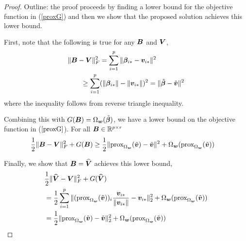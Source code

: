 \begin{proof}
Outline: the proof proceeds by finding a lower bound for the objective function in (\ref{proxG}) and then we show that the proposed solution achieves this lower bound.

First, note that the following is true for any $\boldsymbol{B}$ and $\boldsymbol{V}$,
\begin{align*}\label{eqn1}
\|\bB - \bV\|_F^2 &= \sum_{i=1}^p\|\bbeta_{i \a} - \bv_{i \a}\|^2 \\
 \geq \sum_{i=1}^p&(\|\bbeta_{i \a}\| - \|\bv_{i \a}\|)^2 = \|\tilde{\bbeta} - \tilde{\bv}\|^2
\end{align*}
where the inequality follows from reverse triangle inequality. 

Combining this with $G(\boldsymbol{B}) = \Omega_{\boldsymbol{w}}(\tilde{\boldsymbol{\beta}})$, we have a lower bound on the objective function in ($\ref{proxG}$). For all $\boldsymbol{B} \in {\mathbb R}^{p \times r}$
\begin{align*}
\frac{1}{2}\|\boldsymbol{B} - \boldsymbol{V}\|_F^2 + G(\boldsymbol{B})
&\geq \frac{1}{2} \|\textnormal{prox}_{\Omega_{\boldsymbol{w}}}(\tilde{\boldsymbol{v}}) -  \tilde{\boldsymbol{v}}\|^2 + \Omega_{\boldsymbol{w}}(\textnormal{prox}_{\Omega_{\boldsymbol{w}}}(\tilde{\boldsymbol{v}})) 
\end{align*}

Finally, we show that $\boldsymbol{B} = \widehat {\boldsymbol{V}}$ achieves this lower bound,
\begin{align*}
&\frac{1}{2}\|\widehat {\boldsymbol{V}} - \boldsymbol{V}\|_F^2 + G(\widehat {\boldsymbol{V}}) \\
& = \frac{1}{2} \sum_{i = 1}^p \|(\textnormal{prox}_{\Omega_{\boldsymbol{w}}}(\tilde{\boldsymbol{v}}))_i \frac{\boldsymbol{v}_{i {\ast}}}{\|\boldsymbol{v}_{i {\ast}}\|} - \boldsymbol{v}_{i {\ast}}\|^2_2 + \Omega_{\boldsymbol{w}}(\textnormal{prox}_{\Omega_{\boldsymbol{w}}}(\tilde{\boldsymbol{v}})) \\
 & = \frac{1}{2} \|\textnormal{prox}_{\Omega_{\boldsymbol{w}}}(\tilde{\boldsymbol{v}}) -  \tilde{\boldsymbol{v}}\|^2_2 + \Omega_{\boldsymbol{w}}(\textnormal{prox}_{\Omega_{\boldsymbol{w}}}(\tilde{\boldsymbol{v}})) 
\end{align*}
\end{proof}
